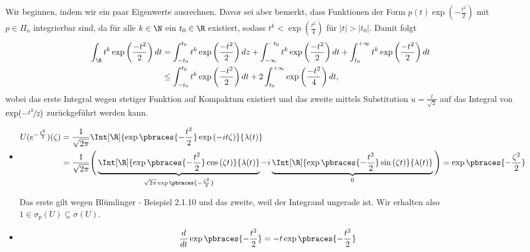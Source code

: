 \begin{solution}

Wir beginnen, indem wir ein paar Eigenwerte ausrechnen.
Davor sei aber bemerkt, dass Funktionen der Form $p(t)\exp(-\frac{t^2}{2})$ mit $p \in \Pi_n$ integrierbar sind, da für alle $k \in \N$
ein $t_0 \in \R$ existiert, sodass $t^k < \exp(\frac{t^2}{4})$ für $|t| > |t_0|$. Damit folgt
\begin{align*}
  \int_\R t^k \exp\left(\frac{-t^2}{2}\right) dt &= \int_{-t_0}^{t_0} t^k \exp\left(\frac{-t^2}{2}\right) dz
  + \int_{-\infty}^{-t_0} t^k \exp\left(\frac{-t^2}{2}\right) dt + \int_{t_0}^{+\infty} t^k \exp\left(\frac{-t^2}{2}\right) dt\\
  &\leq \int_{-t_0}^{t_0} t^k \exp\left(\frac{-t^2}{2}\right) dt + 2\int_{t_0}^{+\infty}\exp\left(\frac{-t^2}{4}\right)  dt,
\end{align*}
wobei das erste Integral wegen stetiger Funktion auf Kompaktum existiert und
das zweite mittels Substitution $u = \frac{t}{\sqrt{2}}$ auf das Integral von $\exp(-\nicefrac{t^2}{2})$
zurückgeführt werden kann.
\FloatBarrier
\begin{itemize}
  \item
  \begin{align*}
    U(e^{-\frac{t^2}{2}})(\zeta)
    & =
    \frac{1}{\sqrt{2 \pi}}
    \Int[\R]
    {
      \exp \pbraces{-\frac{t^2}{2}}
      \exp{(-i t \zeta)}
    }
    {\lambda(t)} \\
    & =
    \frac{1}{\sqrt{2 \pi}}
    \Bigg (
      \underbrace
      {
      \Int[\R]
      {
      \exp \pbraces{-\frac{t^2}{2}}
      \cos{(\zeta t)}
      }
      {\lambda(t)}
      }_{
      \sqrt{2 \pi}
      \exp \pbraces{-\frac{\zeta^2}{2}}
      } -
      i
      \underbrace
      {
      \Int[\R]
      {
      \exp \pbraces{-\frac{t^2}{2}}
      \sin{(\zeta t)}
      }
      {\lambda(t)}
      }_0
    \Bigg )
    =
    \exp \pbraces{-\frac{\zeta^2}{2}}
  \end{align*}

  Das erste  gilt wegen Blümlinger - Beispiel 2.1.10 und das zweite, weil der Integrand ungerade ist.
  Wir erhalten also $1 \in \sigma_p(U) \subseteq \sigma(U)$.
  \FloatBarrier
  \FloatBarrier
  \item
  \begin{align*}
    \frac{d}{dt}
    \exp \pbraces{-\frac{t^2}{2}}
    =
    -t \exp \pbraces{-\frac{t^2}{2}}
  \end{align*}




\end{itemize}
\end{solution}
